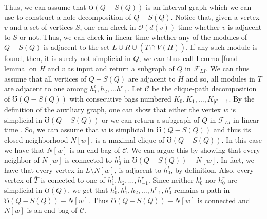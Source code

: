\documentclass{article}
\begin{document}
    Thus, we can assume
    that $\mho\left(Q - S\left(Q\right)\right)$
    is an interval graph
    which we can use to
    construct a hole
    decomposition of $Q - S\left(Q\right)$.
    Notice that, given
    a vertex $v$ and
    a set of vertices
    $S$, one
    can check in
    $\mathcal{O}\left(d\left(v\right)\right)$
    time whether $v$ 
    is adjacent to $S$ 
    or not. Thus, we can
    check in linear time
    whether any of 
    the modules of $Q - S\left(Q\right)$ 
    is adjacent to the set
    $L \cup R \cup \left(\overline{T} \cap V\left(H\right)\right)$.
    If any such module is found,
    then, it is surely not
    simplicial in $Q$,
    we can thus call
    Lemma \ref{fund lemma}
    on $H$ and $v$ as input
    and return a subgraph
    of $Q$ in $\mathcal{F}_{LI}$.
    We can thus assume 
    that all vertices of
    $Q - S\left(Q\right)$ 
    are adjacent to $H$ 
    and so, all modules
    in $\overline{T}$
    are adjacent to
    one among $h_1^{l}, h_2, \ldots h_{-1}^{r}$.
    Let $\mathcal{C}$ be the
    clique-path decomposition
    of $\mho\left(Q - S\left(Q\right)\right)$
    with consecutive bags
    numbered $K_0, K_1, \ldots, K_{\left|\mathcal{C}\right| - 1}$.
    By the definition of
    the auxiliary graph, 
    one can
    show that either the vertex $w$ 
    is simplicial in $\mho\left(Q - S\left(Q\right)\right)$ or
    we can return a
    subgraph of $Q$ in
    $\mathcal{F}_{LI}$
    in linear time \cite{main}.
    So, we can assume
    that $w$ is simplicial
    in $\mho\left(Q - S\left(Q\right)\right)$
    and thus
    its closed neighborhood
    $N\left[w\right]$, is
    a maximal clique of
    $\mho\left(Q - S\left(Q\right)\right)$.
    In this case we have
    that $N\left[w\right]$ 
    is an end bag of
    $\mathcal{C}$.
    We can argue this
    by showing that
    every neighbor 
    of $N\left[w\right]$ 
    is connected to $h_0^{l}$ 
    in $\mho\left(Q - S\left(Q\right)\right) - N\left[w\right]$.
    In fact, we have that
    every vertex in
    $L \setminus N\left[w\right]$,
    is adjacent to $h_0^{l}$,
    by definition.
    Also, every vertex of 
    $\overline{T}$ is conected
    to one of $h_1^{l}, h_2, \ldots, h_{-1}^{r}$.
    Since neither $h_0^{l}$ nor $h_0^{r}$ 
    are simplicial in $\mho\left(Q\right)$,
    we get that $h_0^{l}, h_1^{l}, h_2, \ldots,
    h_{-1}^{r}, h_0^{r}$ remains a path
    in $\mho\left(Q - S\left(Q\right)\right) - N\left[w\right]$.
    Thus $\mho\left(Q - S\left(Q\right)\right) - N\left[w\right]$
    is connected and $N\left[w\right]$
    is an end bag of $\mathcal{C}$.
\end{document}
